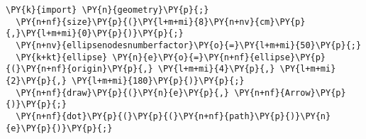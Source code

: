 \begin{Verbatim}[commandchars=\\\{\}]
  \PY{k}{import} \PY{n}{geometry}\PY{p}{;}
  \PY{n+nf}{size}\PY{p}{(}\PY{l+m+mi}{8}\PY{n+nv}{cm}\PY{p}{,}\PY{l+m+mi}{0}\PY{p}{)}\PY{p}{;}
  \PY{n+nv}{ellipsenodesnumberfactor}\PY{o}{=}\PY{l+m+mi}{50}\PY{p}{;}
  \PY{k+kt}{ellipse} \PY{n}{e}\PY{o}{=}\PY{n+nf}{ellipse}\PY{p}{(}\PY{n+nf}{origin}\PY{p}{,} \PY{l+m+mi}{4}\PY{p}{,} \PY{l+m+mi}{2}\PY{p}{,} \PY{l+m+mi}{180}\PY{p}{)}\PY{p}{;}
  \PY{n+nf}{draw}\PY{p}{(}\PY{n}{e}\PY{p}{,} \PY{n+nf}{Arrow}\PY{p}{)}\PY{p}{;}
  \PY{n+nf}{dot}\PY{p}{(}\PY{p}{(}\PY{n+nf}{path}\PY{p}{)}\PY{n}{e}\PY{p}{)}\PY{p}{;}
\end{Verbatim}
